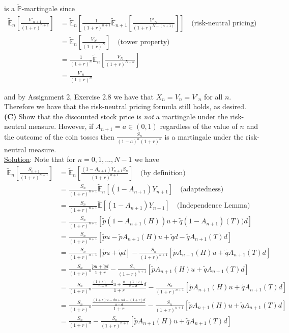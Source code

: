 \documentclass[12pt]{article}
\renewcommand{\P}{\mathbb P}
\newcommand{\E}{\mathbb E}
\begin{document}
is a $\tilde{\P}$-martingale since
\begin{align*}
	\tilde{\E}_n \left[ \frac{V'_{n + 1}}{(1 + r)^{n + 1}} \right] &= \tilde{\E}_n \left[ \frac{1}{(1 + r)^{n + 1}} \tilde{\E}_{n + 1} \left[ \frac{V'_N}{(1 + r)^{N - (n + 1)}} \right] \right] \quad \text{(risk-neutral pricing)} \\
	&= \tilde{\E}_n \left[ \frac{V_N}{(1 + r)^N} \right] \quad \text{(tower property)} \\
	&= \frac{1}{(1 + r)^n} \tilde{\E}_n \left[ \frac{V_N}{(1 + r)^{N - n}} \right] \\
	&= \frac{V'_n}{(1 + r)^n} 
\end{align*}

and by Assignment 2, Exercise 2.8 we have that $X_n = V_n = V'_n$ for all $n$. Therefore we have that the risk-neutral pricing formula still holds, as desired. \\

{\bf (C)} Show that the discounted stock price is {\em not} a martingale under the risk-neutral measure. However, if $A_{n + 1} = a \in (0, 1)$ regardless of the value of $n$ and the outcome of the coin tosses then $\frac{S_n}{(1 - a)^n(1 + r)^n}$ is a martingale under the risk-neutral measure. \\

\underline{Solution}: Note that for $n = 0, 1,..., N - 1$ we have
\begin{align*}
	\tilde{\E}_n \left[ \frac{S_{n + 1}}{(1 + r)^{n + 1}} \right] &= \tilde{\E}_n \left[ \frac{(1 - A_{n + 1})Y_{n + 1}S_n}{(1 + r)^{n + 1}} \right] \quad \text{(by definition)} \\
	&= \frac{S_n}{(1 + r)^{n + 1}} \tilde{\E}_n [(1 - A_{n + 1})Y_{n + 1}] \quad \text{(adaptedness)} \\
	&= \frac{S_n}{(1 + r)^{n + 1}} \tilde{\E} [(1 - A_{n + 1})Y_{n + 1}] \quad \text{(Independence Lemma)} \\
	&= \frac{S_n}{(1 + r)^{n + 1}} [\tilde{p}(1 - A_{n + 1}(H))u + \tilde{q}(1 - A_{n + 1})(T))d] \\
	&= \frac{S_n}{(1 + r)^{n + 1}} [\tilde{p}u - \tilde{p}A_{n + 1}(H)u + \tilde{q}d - \tilde{q}A_{n + 1}(T)d] \\
	&= \frac{S_n}{(1 + r)^{n + 1}} [\tilde{p}u + \tilde{q}d] - \frac{S_n}{(1 + r)^{n + 1}}[\tilde{p}A_{n + 1}(H)u + \tilde{q}A_{n + 1}(T)d] \\
	&= \frac{S_n}{(1 + r)^n} \frac{\tilde{p}u + \tilde{q}d}{1 + r} - \frac{S_n}{(1 + r)^{n + 1}}[\tilde{p}A_{n + 1}(H)u + \tilde{q}A_{n + 1}(T)d] \\
	&= \frac{S_n}{(1 + r)^n} \frac{ \frac{(1 + r) - d}{u - d}u + \frac{u - (1 + r)}{u - d}d}{1 + r} - \frac{S_n}{(1 + r)^{n + 1}}[\tilde{p}A_{n + 1}(H)u + \tilde{q}A_{n + 1}(T)d] \\
	&= \frac{S_n}{(1 + r)^n} \frac{ \frac{(1 + r)u - du + ud - (1 + r)d}{u - d} }{1 + r} - \frac{S_n}{(1 + r)^{n + 1}}[\tilde{p}A_{n + 1}(H)u + \tilde{q}A_{n + 1}(T)d] \\
	&= \frac{S_n}{(1 + r)^n} - \frac{S_n}{(1 + r)^{n + 1}}[\tilde{p}A_{n + 1}(H)u + \tilde{q}A_{n + 1}(T)d] \\
\end{align*}
\end{document}
